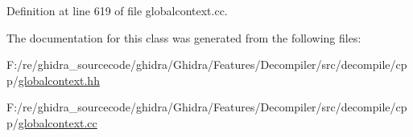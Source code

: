 Definition at line 619 of file globalcontext.\+cc.



The documentation for this class was generated from the following files\+:\begin{DoxyCompactItemize}
\item 
F\+:/re/ghidra\+\_\+sourcecode/ghidra/\+Ghidra/\+Features/\+Decompiler/src/decompile/cpp/\mbox{\hyperlink{globalcontext_8hh}{globalcontext.\+hh}}\item 
F\+:/re/ghidra\+\_\+sourcecode/ghidra/\+Ghidra/\+Features/\+Decompiler/src/decompile/cpp/\mbox{\hyperlink{globalcontext_8cc}{globalcontext.\+cc}}\end{DoxyCompactItemize}
